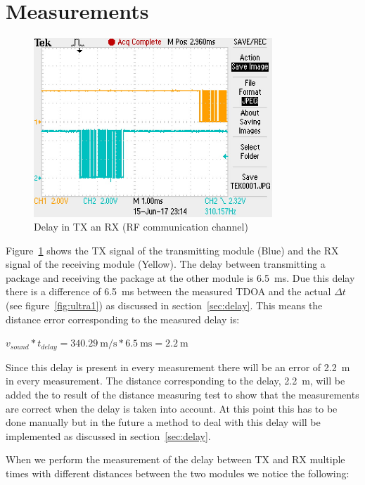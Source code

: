 \section{Measurements}

\begin{figure}[H]
\centering
\includegraphics[width=0.8\textwidth]{Figures/delay_tx_rx.JPG}
\caption{Delay in TX an RX (RF communication channel)}
\label{fig:delay_tx_rx}
\end{figure}

Figure~\ref{fig:delay_tx_rx} shows the TX signal of the transmitting module (Blue) and the RX signal of the receiving module (Yellow).
The delay between transmitting a package and receiving the package at the other module is \SI{6.5}{\milli\second}.
Due this delay there is a difference of \SI{6.5}{\milli\second} between the measured TDOA and the actual $\Delta t$ (see figure~\ref{fig:ultra1}) as discussed in section~\ref{sec:delay}.
This means the distance error corresponding to the measured delay is:

$ v_{sound} * t_{delay} = \SI{340.29}{\meter\per\second} * \SI{6.5}{\milli\second} = \SI{2.2}{\meter} $

Since this delay is present in every measurement there will be an error of \SI{2.2}{\meter} in every measurement.
The distance corresponding to the delay, \SI{2.2}{\meter}, will be added the to result of the distance measuring test to show that the measurements are correct when the delay is taken into account.
At this point this has to be done manually but in the future a method to deal with this delay will be implemented as discussed in section~\ref{sec:delay}.

When we perform the measurement of the delay between TX and RX multiple times with different distances between the two modules we notice the following:


